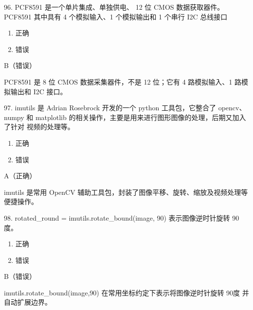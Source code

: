 \begin{question}{96. PCF8591 是一个单片集成、单独供电、 12 位 CMOS 数据获取器件。 PCF8591 其中具有 4 个模拟输入、1 个模拟输出和 1 个串行 I2C 总线接口}
\begin{enumerate}[label=\Alph*., leftmargin=2.4em, itemsep=0.2em]
\item 正确
\item 错误
\end{enumerate}
\end{question}
\begin{answer}
B（错误）
\end{answer}
\begin{explanation}
PCF8591 是 8 位 CMOS 数据采集器件，不是 12 位；它有 4 路模拟输入、1 路模拟输出和 I2C 接口。
\end{explanation}

\begin{question}{97. imutils 是 Adrian Rosebrock 开发的一个 python 工具包，它整合了 opencv、 numpy 和 matplotlib 的相关操作，主要是用来进行图形图像的处理，后期又加入了针对 视频的处理等。}
\begin{enumerate}[label=\Alph*., leftmargin=2.4em, itemsep=0.2em]
\item 正确
\item 错误
\end{enumerate}
\end{question}
\begin{answer}
A（正确）
\end{answer}
\begin{explanation}
imutils 是常用 OpenCV 辅助工具包，封装了图像平移、旋转、缩放及视频处理等便捷操作。
\end{explanation}

\begin{question}{98. rotated\_round = imutils.rotate\_bound(image, 90) 表示图像逆时针旋转 90 度。}
\begin{enumerate}[label=\Alph*., leftmargin=2.4em, itemsep=0.2em]
\item 正确
\item 错误
\end{enumerate}
\end{question}
\begin{answer}
B（错误）
\end{answer}
\begin{explanation}
imutils.rotate_bound(image,90) 在常用坐标约定下表示将图像逆时针旋转 90度 并自动扩展边界。
\end{explanation}

